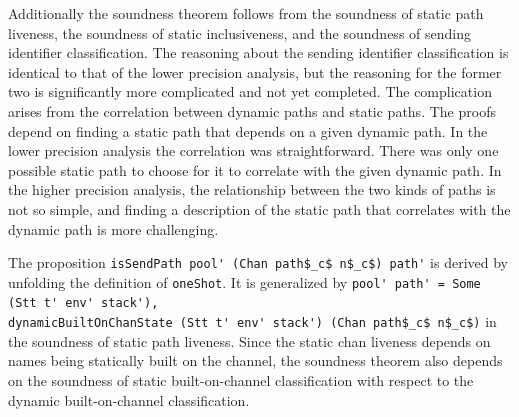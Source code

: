 \documentclass[letterpaper, 11pt]{report}
\begin{document}
Additionally the soundness theorem follows from the soundness of static path liveness,
the soundness of static inclusiveness, and the soundness of sending identifier classification. 
The reasoning about the sending identifier classification is identical to that of the lower precision analysis,
but the reasoning for the former two is significantly more complicated and not yet completed.
The complication arises from the correlation between dynamic paths and static paths.
The proofs depend on finding a static path that depends on a given dynamic path.
In the lower precision analysis the correlation was straightforward.
There was only one possible static path to choose for it
to correlate with the given dynamic path. In the higher precision analysis, the relationship
between the two kinds of paths is not so simple, and finding a description of the static path
that correlates with the dynamic path is more challenging.

The proposition \lstinline[mathescape]{isSendPath pool' (Chan path$_c$ n$_c$) path'} is derived
by unfolding the definition of \lstinline{oneShot}.
It is generalized by \lstinline[mathescape]{pool' path' = Some (Stt t' env' stack'),}\\
\lstinline[mathescape]{dynamicBuiltOnChanState (Stt t' env' stack') (Chan path$_c$ n$_c$)} in the soundness of
static path liveness. Since the static chan liveness depends on names being statically built on the channel,
the soundness theorem also depends on the soundness of static built-on-channel classification with respect
to the dynamic built-on-channel classification.
\end{document}
